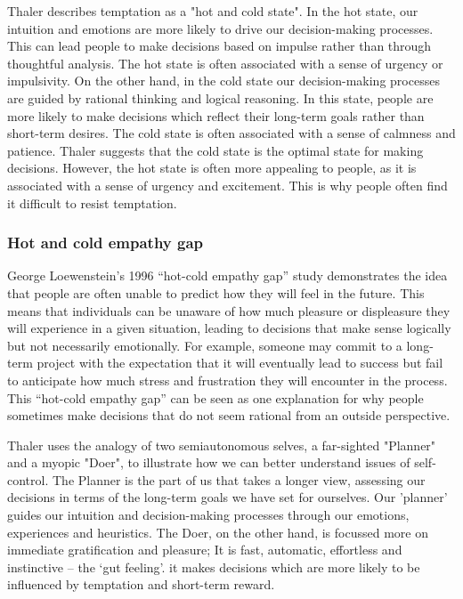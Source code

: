 
Thaler describes temptation as a "hot and cold state". In the hot state, our intuition and emotions are
more likely to drive our decision-making processes. This can lead people to make decisions based on impulse rather than through thoughtful analysis.
The hot state is often associated with a sense of urgency or impulsivity.
On the other hand, in the cold state our decision-making processes are guided by rational thinking and logical reasoning.
In this state, people are more likely to make decisions which reflect their
long-term goals rather than short-term desires. The cold state is often associated with a sense of calmness and patience.
Thaler suggests that the cold state is the optimal state for making decisions.
However, the hot state is often more appealing to people, as it is associated with a sense of urgency and excitement.
This is why people often find it difficult to resist temptation.\cite[ch 1.3, p.4]{Thaler2008}

\subsubsection{Hot and cold empathy gap}
George Loewenstein’s 1996 “hot-cold empathy gap” study demonstrates the idea that people are often unable to predict how
they will feel in the future. This means that individuals can be unaware of how much pleasure or displeasure they will experience
in a given situation, leading to decisions that make sense logically but not necessarily emotionally.
For example, someone may commit to a long-term project with the expectation that it will eventually lead to success
but fail to anticipate how much stress and frustration they will encounter in the process. This “hot-cold empathy
gap” can be seen as one explanation for why people sometimes make decisions that do not seem rational from an outside
perspective.\cite{Loewenstein1996Mar}

Thaler uses the analogy of two semiautonomous selves, a far-sighted "Planner" and a myopic "Doer",
to illustrate how we can better understand issues of self-control.
The Planner is the part of us that takes a longer view,
assessing our decisions in terms of the long-term goals we have set for ourselves.
Our 'planner' guides our intuition and decision-making processes through our
emotions, experiences and heuristics.
The Doer, on the other hand, is focussed more on immediate gratification and pleasure;
It is fast, automatic, effortless and instinctive – the ‘gut feeling’.
it makes decisions which are more likely to be influenced by temptation and short-term reward.
\cite[ch 1.3, p.4]{Thaler2008}

